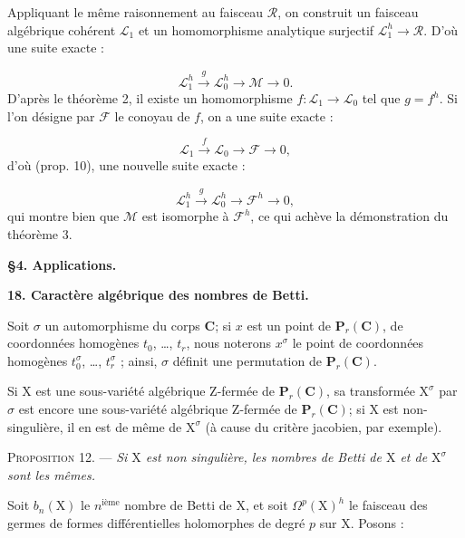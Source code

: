 Appliquant le même raisonnement au faisceau $\mathcal{R}$, on construit un faisceau algébrique cohérent $\mathcal{L}_1$ et un homomorphisme analytique surjectif $\mathcal{L}_1^h \to \mathcal{R}$. D'où une suite exacte :

\begin{equation*}
\mathcal{L}_1^h \xrightarrow{\ g\ } \mathcal{L}_0^h \to \mathcal{M} \to 0.
\end{equation*}
D'après le théorème 2, il existe un homomorphisme $f : \mathcal{L}_1 \to \mathcal{L}_0$ tel que $g = f^h$. Si l'on désigne par $\mathcal{F}$ le conoyau de $f$, on a une suite exacte :

\begin{equation*}
\mathcal{L}_1 \xrightarrow{\ f\ } \mathcal{L}_0 \to \mathcal{F} \to 0,
\end{equation*}
d'où (prop. 10), une nouvelle suite exacte :

\begin{equation*}
\mathcal{L}_1^h \xrightarrow{\ g\ } \mathcal{L}_0^h \to \mathcal{F}^h \to 0,
\end{equation*}
qui montre bien que $\mathcal{M}$ est isomorphe à $\mathcal{F}^h$, ce qui achève la démonstration du théorème 3.


\begin{center}\textbf{\S 4. Applications.}\end{center}


\textbf{18. Caractère algébrique des nombres de Betti.}

Soit $\sigma$ un automorphisme du corps $\mathbf{C}$; si $x$ est un point de $\mathbf{P}_r(\mathbf{C})$, de coordonnées homogènes $t_0$, \ldots, $t_r$, nous noterons $x^\sigma$ %
le point de coordonnées homogènes $t_0^\sigma$, \ldots, $t_r^\sigma$ ; ainsi, $\sigma$ définit une permutation de $\mathbf{P}_r(\mathbf{C})$.

Si $\mathrm{X}$ est une sous-variété algébrique Z-fermée de $\mathbf{P}_r(\mathbf{C})$, sa transformée $\mathrm{X}^\sigma$ par $\sigma$ est encore une sous-variété algébrique Z-fermée de $\mathbf{P}_r(\mathbf{C})$; si $\mathrm{X}$ est non-singulière, il en est de même de $\mathrm{X}^\sigma$ (à cause du critère jacobien, par exemple).

\textsc{Proposition} 12. --- \textit{Si $\mathrm{X}$ est non singulière, les nombres de Betti de $\mathrm{X}$ et de $\mathrm{X}^\sigma$ sont les mêmes.}

Soit $b_n(\mathrm{X})$ le $n^{\textrm{ième}}$ nombre de Betti de $\mathrm{X}$, et soit $\Omega^p(\mathrm{X})^h$ le faisceau des germes de formes différentielles holomorphes de degré $p$ sur $\mathrm{X}$. Posons :

